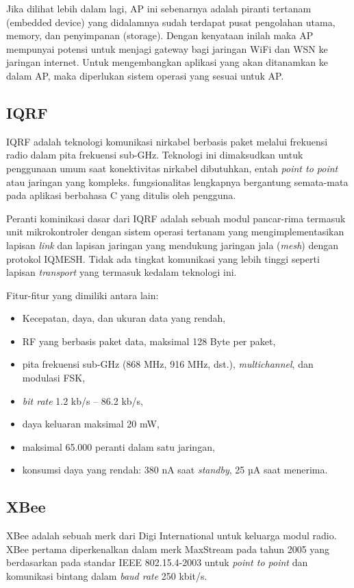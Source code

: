     Jika dilihat lebih dalam lagi, AP ini sebenarnya adalah piranti tertanam (embedded device) yang didalamnya sudah terdapat pusat pengolahan utama, memory, dan penyimpanan (storage). Dengan kenyataan inilah maka AP mempunyai potensi untuk menjagi gateway bagi jaringan WiFi dan WSN ke jaringan internet. Untuk mengembangkan aplikasi yang akan ditanamkan ke dalam AP, maka diperlukan sistem operasi yang sesuai untuk AP.

  \subsection{IQRF}
    IQRF adalah teknologi komunikasi nirkabel berbasis paket melalui frekuensi radio dalam pita frekuensi sub-GHz. Teknologi ini dimaksudkan untuk penggunaan umum saat konektivitas nirkabel dibutuhkan, entah \emph{point to point} atau jaringan yang kompleks. fungsionalitas lengkapnya bergantung semata-mata pada aplikasi berbahasa C yang ditulis oleh pengguna.

    Peranti kominikasi dasar dari IQRF adalah sebuah modul pancar-rima termasuk unit mikrokontroler dengan sistem operasi tertanam yang mengimplementasikan lapisan \emph{link} dan lapisan jaringan yang mendukung jaringan jala (\emph{mesh}) dengan protokol IQMESH. Tidak ada tingkat komunikasi yang lebih tinggi seperti lapisan \emph{transport} yang termasuk kedalam teknologi ini.

    Fitur-fitur yang dimiliki antara lain:
      \begin{itemize}
        \item Kecepatan, daya, dan ukuran data yang rendah,
        \item RF yang berbasis paket data, maksimal 128 Byte per paket,
        \item pita frekuensi sub-GHz (868 MHz, 916 MHz, dst.), \emph{multichannel}, dan modulasi FSK,
        \item \emph{bit rate} 1.2 kb/s – 86.2 kb/s,
        \item daya keluaran maksimal 20 mW,
        \item maksimal 65.000 peranti dalam satu jaringan,
        \item konsumsi daya yang rendah: 380 nA saat \emph{standby}, 25 µA saat menerima.
      \end{itemize}


  \subsection{XBee}
    XBee adalah sebuah merk dari Digi International untuk keluarga modul radio. XBee pertama diperkenalkan dalam merk MaxStream pada tahun 2005 yang berdasarkan pada standar IEEE 802.15.4-2003 untuk \emph{point to point} dan komunikasi bintang dalam \emph{baud rate} 250 kbit/s.

